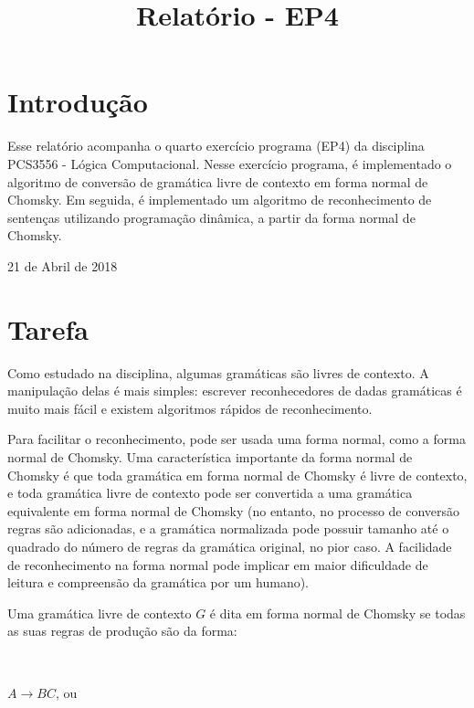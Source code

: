 \documentclass[conference]{IEEEtran}
\begin{document}
\title{Relatório - EP4}

\author{
}

\maketitle

\section{Introdução}
Esse relatório acompanha o quarto exercício programa (EP4) da disciplina PCS3556 - Lógica Computacional. Nesse exercício programa, é implementado o algoritmo de conversão de gramática livre de contexto em forma normal de Chomsky. Em seguida, é implementado um algoritmo de reconhecimento de sentenças utilizando programação dinâmica, a partir da forma normal de Chomsky.

\hfill 21 de Abril de 2018

\section{Tarefa}

Como estudado na disciplina, algumas gramáticas são livres de contexto. A manipulação delas é mais simples: escrever reconhecedores de dadas gramáticas é muito mais fácil e existem algoritmos rápidos de reconhecimento.

Para facilitar o reconhecimento, pode ser usada uma forma normal, como a forma normal de Chomsky. Uma característica importante da forma normal de Chomsky é que toda gramática em forma normal de Chomsky é livre de contexto, e toda gramática livre de contexto pode ser convertida a uma gramática equivalente em forma normal de Chomsky (no entanto, no processo de conversão regras são adicionadas, e a gramática normalizada pode possuir tamanho até o quadrado do número de regras da gramática original, no pior caso. A facilidade de reconhecimento na forma normal pode implicar em maior dificuldade de leitura e compreensão da gramática por um humano).

Uma gramática livre de contexto $G$ é dita em forma normal de Chomsky se todas as suas regras de produção são da forma:

\

$A \to BC$, ou
\end{document}
